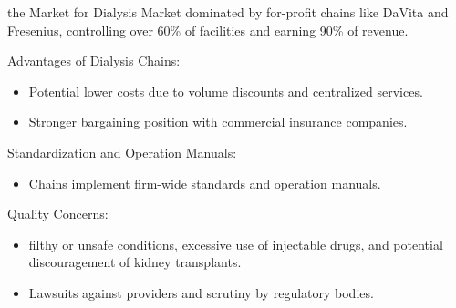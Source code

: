 \begin{frame}{the Market for Dialysis}
Market dominated by for-profit chains like DaVita and Fresenius, controlling over 60\% of facilities and earning 90\% of revenue.

Advantages of Dialysis Chains:
\begin{itemize}
    \item Potential lower costs due to volume discounts and centralized services.
    \item Stronger bargaining position with commercial insurance companies.
\end{itemize}

Standardization and Operation Manuals:
\begin{itemize}
    \item Chains implement firm-wide standards and operation manuals.
\end{itemize}

Quality Concerns:
\begin{itemize}
    \item filthy or unsafe conditions, excessive use of injectable drugs, and potential discouragement of kidney transplants.
    \item Lawsuits against providers and scrutiny by regulatory bodies.
\end{itemize}

\end{frame}
